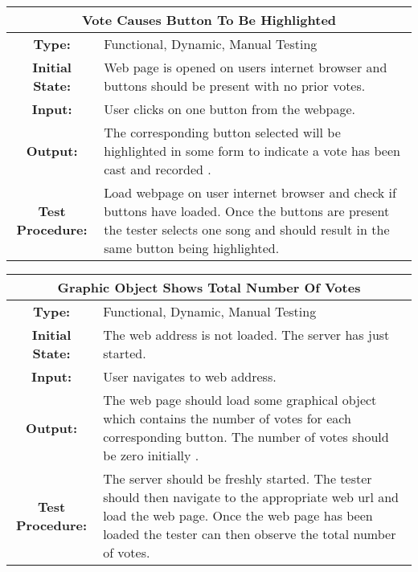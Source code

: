 \documentclass[12pt, titlepage]{article}
\begin{document}
\begin{center}
\begin{table}[H]
\begin{tabularx}{\textwidth}{| c X |}
\hline
\multicolumn{2}{|c|}{\textbf{Vote Causes Button To Be Highlighted}}\\
\hline
\textbf{Type: } & Functional, Dynamic, Manual Testing\\

\textbf{Initial State: } & Web page is opened on users internet browser and buttons should be present with no prior votes.\\

\textbf{Input: } & User clicks on one button from the webpage.\\

\textbf{Output: } & The corresponding button selected will be highlighted in some form to indicate a vote has been cast and recorded .\\

\textbf{Test Procedure:  } & Load webpage on user internet browser and check if buttons have loaded. Once the buttons are present the tester selects one song and should result in the same button being highlighted.\\
\hline
\end{tabularx}
\end{table}
\end{center}

\begin{center}
\begin{table}[H]
\begin{tabularx}{\textwidth}{| c X |}
\hline
\multicolumn{2}{|c|}{\textbf{Graphic Object Shows Total Number Of Votes}}\\
\hline
\textbf{Type: } & Functional, Dynamic, Manual Testing\\

\textbf{Initial State: } & The web address is not loaded. The server has just started.\\

\textbf{Input: } & User navigates to web address.\\

\textbf{Output: } & The web page should load some graphical object which contains the number of votes for each corresponding button. The number of votes should be zero initially .\\

\textbf{Test Procedure:  } & The server should be freshly started. The tester should then navigate to the appropriate web url and load the web page. Once the web page has been loaded the tester can then observe the total number of votes.\\
\hline
\end{tabularx}
\end{table}
\end{center}
\end{document}
